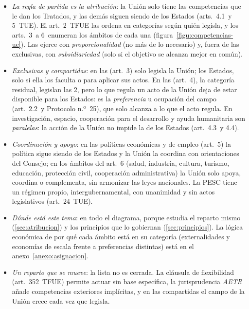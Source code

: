 \documentclass[11pt]{article}
\begin{document}
\begin{itemize}
\item \emph{La regla de partida es la atribución}: la Unión solo tiene las competencias que le dan los Tratados, y las demás siguen siendo de los Estados (arts.~4.1~y 5~TUE). El art.~2~TFUE las ordena en categorías según quién legisla, y los arts.~3~a 6~enumeran los ámbitos de cada una (figura~\ref{figu:competencias-ue}). Las ejerce con \emph{proporcionalidad} (no más de lo necesario) y, fuera de las exclusivas, con \emph{subsidiariedad} (solo si el objetivo se alcanza mejor en común).
\item \emph{Exclusivas y compartidas}: en las  (art.~3) solo legisla la Unión; los Estados, solo si ella los faculta o para aplicar sus actos. En las  (art.~4), la categoría residual, legislan las 2, pero lo que regula un acto de la Unión deja de estar disponible para los Estados: es la \emph{preferencia} u ocupación del campo (art.~2.2~y Protocolo n.º~25), que solo alcanza a lo que el acto regula. En investigación, espacio, cooperación para el desarrollo y ayuda humanitaria son \emph{paralelas}: la acción de la Unión no impide la de los Estados (art.~4.3~y 4.4).
\item \emph{Coordinación y apoyo}: en las políticas económicas y de empleo (art.~5) la política sigue siendo de los Estados y la Unión la coordina con orientaciones del Consejo; en los ámbitos del art.~6 (salud, industria, cultura, turismo, educación, protección civil, cooperación administrativa) la Unión solo apoya, coordina o complementa, sin armonizar las leyes nacionales. La PESC tiene un régimen propio, intergubernamental, con unanimidad y sin actos legislativos (art.~24~TUE).
\item \emph{Dónde está este tema}: en todo el diagrama, porque estudia el reparto mismo (\ref{sec:atribucion}) y los principios que lo gobiernan (\ref{sec:principios}). La lógica económica de por qué cada ámbito está en su categoría (externalidades y economías de escala frente a preferencias distintas) está en el anexo~\ref{anexo:asignacion}.
\item \emph{Un reparto que se mueve}: la lista no es cerrada. La cláusula de flexibilidad (art.~352~TFUE) permite actuar sin base específica, la jurisprudencia \emph{AETR} añade competencias exteriores implícitas, y en las compartidas el campo de la Unión crece cada vez que legisla.
\end{itemize}

\begin{infografia}[H]
\centering
\caption{El reparto de competencias de la Unión (arts.~2~a 6~TFUE)}\label{figu:competencias-ue}
\end{infografia}
\end{document}
